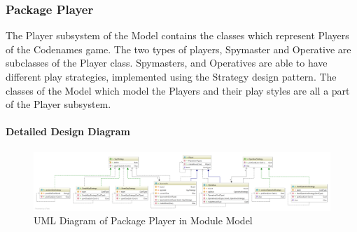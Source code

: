 \subsubsection{Package Player}

The Player subsystem of the Model contains the classes which represent Players of the Codenames game. The two types of players, Spymaster and Operative are subclasses of the Player class. Spymasters, and Operatives are able to have different play strategies, implemented using the Strategy design pattern. The classes of the Model which model the Players and their play styles are all a part of the Player subsystem.

\paragraph{Detailed Design Diagram}\mbox{}
\begin{figure}[H]
\centering
\includegraphics[width=16cm]{Source/Module/Model/Player/Model_Player.png}
\caption{UML Diagram of Package Player in Module Model}
\label{Control.Game}
\end{figure}










